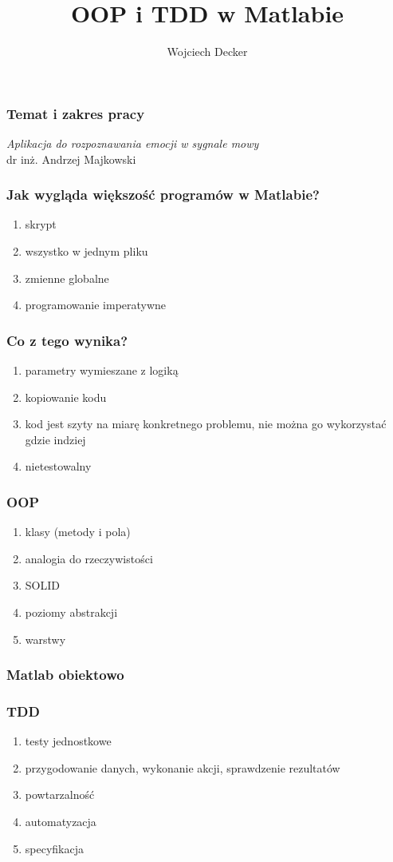 \documentclass{beamer}
\begin{document}
\title{OOP i TDD w Matlabie}
\author{Wojciech Decker}
\maketitle
\begin{frame}
  \frametitle{Temat i zakres pracy}
  {\large\it{Aplikacja do rozpoznawania emocji w sygnale mowy}}
\\
  {dr inż. Andrzej Majkowski}
\end{frame}
\begin{frame}
  \frametitle{Jak wygląda większość programów w Matlabie?}
  \begin{enumerate}
    \item skrypt
    \item wszystko w jednym pliku
    \item zmienne globalne
    \item programowanie imperatywne 
  \end{enumerate}
\end{frame}
\begin{frame}
  \frametitle{Co z tego wynika?}
  \begin{enumerate}
    \item parametry wymieszane z logiką
    \item kopiowanie kodu
    \item kod jest szyty na miarę konkretnego problemu, nie można go wykorzystać gdzie indziej
    \item nietestowalny
  \end{enumerate}
\end{frame}
\begin{frame}
  \frametitle{OOP}
  \begin{enumerate}
    \item klasy (metody i pola)
    \item analogia do rzeczywistości
    \item SOLID
    \item poziomy abstrakcji
    \item warstwy
  \end{enumerate}
\end{frame}
\begin{frame}
  \frametitle{Matlab obiektowo}
  
\end{frame}
\begin{frame}
  \frametitle{TDD}
  \begin{enumerate}
    \item testy jednostkowe
    \item przygodowanie danych, wykonanie akcji, sprawdzenie rezultatów
    \item powtarzalność
    \item automatyzacja
    \item specyfikacja 
  \end{enumerate}
\end{frame}
\end{document}
